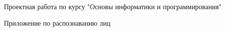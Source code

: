 \documentclass[a4paper,12pt]{article}
\begin{document}
\vfill

%
\begin{center}
  {\normalsize
	Проектная работа по курсу "Основы информатики и программирования"
  }
  
  \medskip

  {\Large
    Приложение по распознаванию лиц
  } \\
  
\end{center}

\medskip
\end{document}
